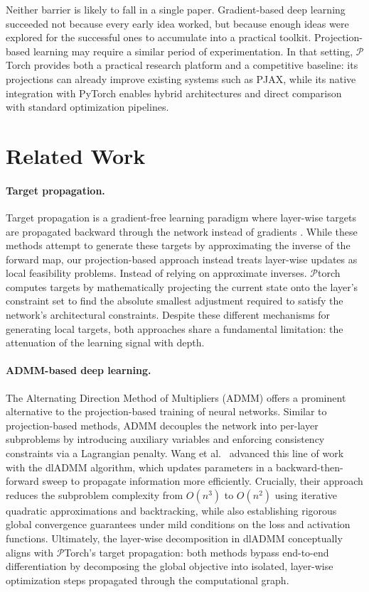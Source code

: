 \documentclass{article}
\begin{document}
Neither barrier is likely to fall in a single paper. Gradient-based deep learning succeeded not because every early idea worked, but because enough ideas were explored for the successful ones to accumulate into a practical toolkit. Projection-based learning may require a similar period of experimentation. In that setting, $\mathcal{P}$Torch provides both a practical research platform and a competitive baseline: its projections can already improve existing systems such as PJAX, while its native integration with PyTorch enables hybrid architectures and direct comparison with standard optimization pipelines.
\printbibliography


\newpage
\appendix
{}

\section{Related Work}

\paragraph{Target propagation.}
Target propagation is a  gradient-free learning paradigm where layer-wise targets are propagated backward through the network instead of gradients \cite{lee2015difference}. While these methods attempt to generate these targets by approximating the inverse of the forward map, our projection-based approach instead treats layer-wise updates as local feasibility problems. Instead of relying on approximate inverses. $\mathcal{P}$torch computes targets by mathematically projecting the current state onto the layer's constraint set to find the absolute smallest adjustment required to satisfy the network's architectural constraints. Despite these different mechanisms for generating local targets, both approaches share a fundamental limitation: the attenuation of the learning signal with depth. 

\paragraph{ADMM-based deep learning.}
The Alternating Direction Method of Multipliers (ADMM)\cite{neal2011distributed} offers a prominent alternative to the projection-based training of neural networks. Similar to projection-based methods, ADMM decouples the network into per-layer subproblems by introducing auxiliary variables and enforcing consistency constraints via a Lagrangian penalty. Wang et al.~\cite{10.1145/3292500.3330936} advanced this line of work with the dlADMM algorithm, which updates parameters in a backward-then-forward sweep to propagate information more efficiently. Crucially, their approach reduces the subproblem complexity from $O(n^3)$ to $O(n^2)$ using iterative quadratic approximations and backtracking, while also establishing rigorous global convergence guarantees under mild conditions on the loss and activation functions. Ultimately, the layer-wise decomposition in dlADMM conceptually aligns with $\mathcal{P}$Torch's target propagation: both methods bypass end-to-end differentiation by decomposing the global objective into isolated, layer-wise optimization steps propagated through the computational graph.
\end{document}
